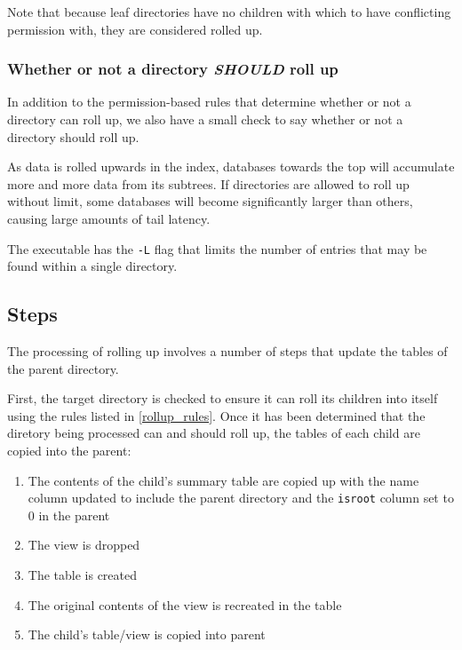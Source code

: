 Note that because leaf directories have no children with which to have
conflicting permission with, they are considered rolled up.

\subsubsection{Whether or not a directory {\it SHOULD} roll up}
In addition to the permission-based rules that determine whether or
not a directory can roll up, we also have a small check to say whether
or not a directory should roll up.

As data is rolled upwards in the index, databases towards the top will
accumulate more and more data from its subtrees. If directories are
allowed to roll up without limit, some databases will become
significantly larger than others, causing large amounts of tail
latency.

The \rollup executable has the \texttt{-L} flag that limits the number
of entries that may be found within a single directory.

\subsection{Steps}
The processing of rolling up involves a number of steps that update
the tables of the parent directory.

First, the target directory is checked to ensure it can roll its
children into itself using the rules listed in
\ref{rollup_rules}. Once it has been determined that the diretory
being processed can and should roll up, the tables of each child are
copied into the parent:

\begin{enumerate}
\item The contents of the child's summary table are copied up with the
  name column updated to include the parent directory and the
  \texttt{isroot} column set to 0 in the parent
\item The \pentries view is dropped
\item The \pentries table is created
\item The original contents of the \pentries view is recreated in the
  \pentries table
\item The child's \pentries table/view is copied into parent
\end{enumerate}

